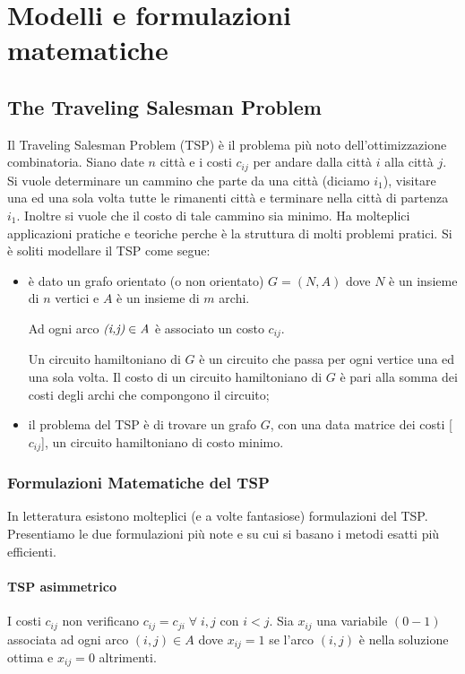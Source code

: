 \chapter{Modelli e formulazioni matematiche}

\section{The Traveling Salesman Problem}
Il Traveling Salesman Problem (TSP) è il problema più noto dell'ottimizzazione combinatoria.
Siano date $n$ città e i costi $c_{ij}$ per andare dalla città $i$ alla città $j$.
Si vuole determinare un cammino che parte da una città (diciamo $i_{1}$), visitare una ed una sola volta tutte le rimanenti città e terminare nella città di partenza $i_{1}$.
Inoltre si vuole che il costo di tale cammino sia minimo.\newline
Ha molteplici applicazioni pratiche e teoriche perche è la struttura di molti problemi pratici.\newline
Si è soliti modellare il TSP come segue:
\begin{itemize}
	\item è dato un grafo orientato (o non orientato) $G = (N,A)$
	dove $N$ è un insieme di $n$ vertici e $A$ è un insieme di $m$ archi.
	
	Ad ogni arco $\emph{(i,j)} \in \emph{A}$ è associato un costo $c_{ij}$.
	
	Un circuito hamiltoniano di $G$ è un circuito che passa per ogni vertice una ed una sola volta.\newline
	Il costo di un circuito hamiltoniano di $G$ è pari alla somma dei costi degli archi che compongono il circuito;
	\item il problema del TSP è di trovare un grafo $G$, con una data matrice dei costi [$c_{ij}$], un circuito hamiltoniano di costo minimo.
\end{itemize}
\newpage
\subsection{Formulazioni Matematiche del TSP}
In letteratura esistono molteplici (e a volte fantasiose) formulazioni del TSP.\newline
Presentiamo le due formulazioni più note e su cui si basano i metodi esatti più efficienti.

\subsubsection{TSP asimmetrico}
I costi $c_{ij}$ non verificano $c_{ij} = c_{ji}\;\forall\;i,j$ con $i < j$.\newline
Sia $x_{ij}$ una variabile $(0-1)$ associata ad ogni arco $(i,j) \in A$ dove $x_{ij}=1$ se l'arco $(i,j)$ è nella soluzione ottima e $x_{ij}=0$ altrimenti.\newline

